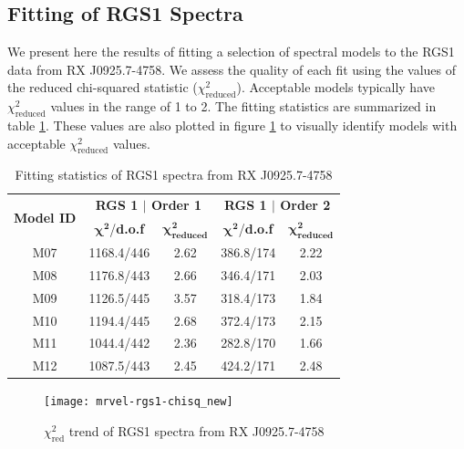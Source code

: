 		\subsection{Fitting of RGS1 Spectra} \label{hi-resolution:analysis:rgs1}
			We present here the results of fitting a selection of spectral models to the RGS1 data from RX J0925.7-4758. We assess the quality of each fit using the values of the reduced chi-squared statistic ($\chi^2_\text{reduced}$). Acceptable models typically have $\chi^2_\text{reduced}$ values in the range of 1 to 2. The fitting statistics are summarized in table \ref{tab:fit-stat:rgs1}.  These values are also plotted in figure \ref{fig:mrvel-rgs1-chisq} to visually identify models with acceptable $\chi^2_\text{reduced}$ values.
			\begin{table}[!htb]
				\centering
				\caption{Fitting statistics of RGS1 spectra from RX J0925.7-4758}
				\label{tab:fit-stat:rgs1}
				\begin{tabular}{c|cc|cc}
					\hline
					\multirow{2}{*}{\textbf{Model ID}} & \multicolumn{2}{c|}{\textbf{RGS 1 $\vert$ Order 1}} & \multicolumn{2}{c}{\textbf{RGS 1 $\vert$ Order 2}} \\ \cline{2-5} & {$\boldsymbol{\chi^2}$/\textbf{d.o.f}} & {$\boldsymbol{\chi^2_\text{reduced}}$} & {$\boldsymbol{\chi^2}$/\textbf{d.o.f}} & {$\boldsymbol{\chi^2_\text{reduced}}$} \\ \hline
					{M07} & {1168.4/446} & {2.62} & {386.8/174} & {2.22} \\
					{M08} & {1176.8/443} & {2.66} & {346.4/171} & {2.03} \\
					{M09} & {1126.5/445} & {3.57} & {318.4/173} & {1.84} \\
					{M10} & {1194.4/445} & {2.68} & {372.4/173} & {2.15} \\
					{M11} & {1044.4/442} & {2.36} & {282.8/170} & {1.66} \\
					{M12} & {1087.5/443} & {2.45} & {424.2/171} & {2.48} \\ \hline
				\end{tabular}
			\end{table}
			
			\begin{figure}[h!]
				\centering
				\texttt{[image: mrvel-rgs1-chisq\_new]}
				\caption{$\chi^2_\text{red}$ trend of RGS1 spectra from RX J0925.7-4758}
				\label{fig:mrvel-rgs1-chisq}
			\end{figure}
		
